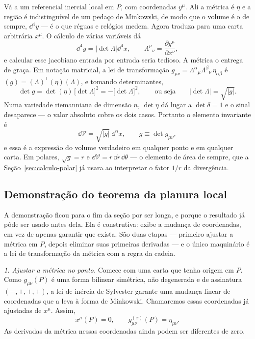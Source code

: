 \documentclass[12pt,a4paper,oneside]{book}
\theoremstyle{rgplain}
\theoremstyle{rgremark}
\begin{document}
Vá a um referencial inercial local em $P$, com coordenadas $y^\mu$. Ali a
métrica é $\eta$ e a região é indistinguível de um pedaço de Minkowski, de
modo que o volume é o de sempre, $\dd^4y$ --- é o que réguas e relógios medem.
Agora traduza para uma carta arbitrária $x^\mu$. O cálculo de várias variáveis
dá
\[
  \dd^4y=\left|\det\Lambda\right|\dd^4x ,
  \qquad
  \Lambda^\mu{}_\nu=\frac{\partial y^\mu}{\partial x^\nu} ,
\]
e calcular esse jacobiano entrada por entrada seria tedioso. A métrica o
entrega de graça. Em notação matricial, a lei de transformação
$g_{\mu\nu}=\Lambda^\alpha{}_\mu\Lambda^\beta{}_\nu\,\eta_{\alpha\beta}$ é
$(g)=(\Lambda)^{\mathsf T}(\eta)(\Lambda)$, e tomando determinantes,
\[
  \det g=\det(\eta)\,\bigl[\det\Lambda\bigr]^2=-\bigl[\det\Lambda\bigr]^2 ,
  \qquad\text{ou seja}\qquad
  \left|\det\Lambda\right|=\sqrt{|g|} .
\]
Numa variedade riemanniana de dimensão $n$, $\det\eta$ dá lugar a
$\det\delta=1$ e o sinal desaparece --- o valor absoluto cobre os dois casos.
Portanto o elemento invariante é
\begin{equation}
  \dd \mathcal{V}=\sqrt{|g|}\;\dd^nx ,
  \qquad g\equiv\det g_{\mu\nu} ,
  \label{eq:volume-proprio}
\end{equation}
e essa é a expressão do volume verdadeiro em qualquer ponto e em qualquer
carta. Em polares, $\sqrt{g}=r$ e $\dd\mathcal{V}=r\,\dd r\,\dd\theta$ ---
o elemento de área de sempre, que a Seção~\ref{sec:calculo-polar} já usara ao
interpretar o fator $1/r$ da divergência.

\subsection*{Demonstração do teorema da planura local}

A demonstração ficou para o fim da seção por ser longa, e porque o resultado
já pôde ser usado antes dela. Ela é construtiva: exibe a mudança de
coordenadas, em vez de apenas garantir que exista. São duas etapas ---
primeiro ajustar a métrica em $P$, depois eliminar suas primeiras derivadas
--- e o único maquinário é a lei de transformação da métrica com a regra da
cadeia.

\begin{samepage}
\emph{1. Ajustar a métrica no ponto.} Comece com uma carta que tenha origem
em $P$. Como $g_{\mu\nu}(P)$ é uma forma bilinear simétrica, não degenerada e
de assinatura $(-,+,+,+)$, a lei de inércia de Sylvester garante uma mudança
linear de coordenadas que a leva à forma de Minkowski. Chamaremos essas
coordenadas já ajustadas de $x^\mu$. Assim,
\[
  x^\mu(P)=0,
  \qquad g^{(x)}_{\mu\nu}(P)=\eta_{\mu\nu}.
\]
As derivadas da métrica nessas coordenadas ainda podem ser diferentes de zero.
\end{samepage}
\end{document}
